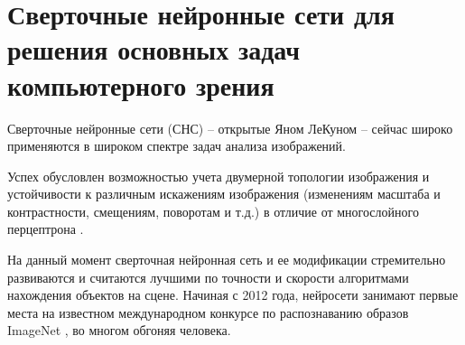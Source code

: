 \section{Сверточные нейронные сети для решения основных задач компьютерного зрения}\label{sect-2}

Сверточные нейронные сети (СНС) -- открытые Яном ЛеКуном \cite{lib-lecun-cnn} -- сейчас широко применяются в широком спектре задач анализа изображений.

Успех обусловлен возможностью учета двумерной топологии изображения и устойчивости к различным искажениям изображения (изменениям масштаба и контрастности, смещениям, поворотам и т.д.) в отличие от многослойного перцептрона \cite{lib-perciptrone}.

На данный момент сверточная нейронная сеть и ее модификации стремительно развиваются и считаются лучшими по точности и скорости алгоритмами нахождения объектов на сцене. Начиная с 2012 года, нейросети занимают первые места на известном международном конкурсе по распознаванию образов ImageNet \cite{lib-imagenet}, во многом обгоняя человека.




\clearpage